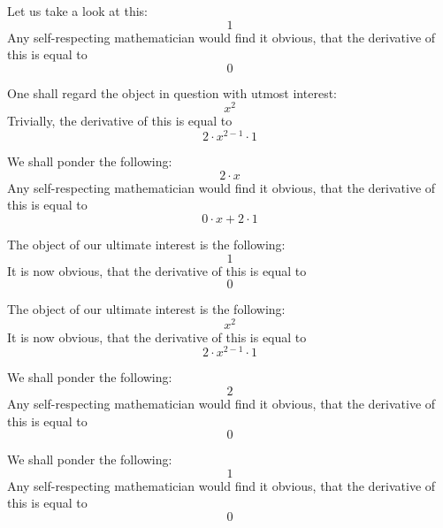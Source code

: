\documentclass{article}
\begin{document}
Let us take a look at this:
\begin{equation}
1 
\end{equation}
Any self-respecting mathematician would find it obvious, that the derivative of this is equal to
\begin{equation}
0 
\end{equation}

One shall regard the object in question with utmost interest:
\begin{equation}
x ^{2 } 
\end{equation}
Trivially, the derivative of this is equal to
\begin{equation}
2 \cdot x ^{2 - 1 } \cdot 1 
\end{equation}

We shall ponder the following:
\begin{equation}
2 \cdot x 
\end{equation}
Any self-respecting mathematician would find it obvious, that the derivative of this is equal to
\begin{equation}
0 \cdot x + 2 \cdot 1 
\end{equation}

The object of our ultimate interest is the following:
\begin{equation}
1 
\end{equation}
It is now obvious, that the derivative of this is equal to
\begin{equation}
0 
\end{equation}

The object of our ultimate interest is the following:
\begin{equation}
x ^{2 } 
\end{equation}
It is now obvious, that the derivative of this is equal to
\begin{equation}
2 \cdot x ^{2 - 1 } \cdot 1 
\end{equation}

We shall ponder the following:
\begin{equation}
2 
\end{equation}
Any self-respecting mathematician would find it obvious, that the derivative of this is equal to
\begin{equation}
0 
\end{equation}

We shall ponder the following:
\begin{equation}
1 
\end{equation}
Any self-respecting mathematician would find it obvious, that the derivative of this is equal to
\begin{equation}
0 
\end{equation}
\end{document}
